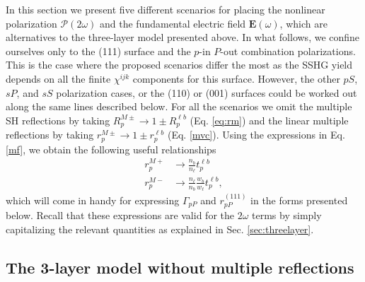 In this section we present five different scenarios for placing the nonlinear
polarization $\boldsymbol{\mathcal{P}}(2\omega)$ and the fundamental electric
field $\mathbf{E}(\omega)$, which are alternatives to the three-layer model
presented above. In what follows, we confine ourselves only to the (111) surface
and the $p$-in $P$-out combination polarizations. This is the case where the
proposed scenarios differ the most as the SSHG yield depends on all the finite
$\chi^{ijk}$ components for this surface. However, the other $pS$, $sP$, and
$sS$ polarization cases, or the (110) or (001) surfaces could be worked out
along the same lines described below. For all the scenarios we omit the multiple
SH reflections by taking $R^{M\pm}_{p}\to 1\pm R^{\ell b}_{p}$ (Eq.
\eqref{eq:rm}) and the linear multiple reflections by taking $r^{M\pm}_{p}\to
1\pm r^{\ell b}_{p}$ (Eq. \eqref{mvc}). Using the expressions in Eq. \eqref{mf},
we obtain the following useful relationships
\begin{equation}\label{mvc89}
\begin{split}
r^{M+}_{p}&\to\frac{n_{b}}{n_{\ell}}t^{\ell b}_{p}\\
r^{M-}_{p}&\to\frac{n_{\ell}}{n_{b}}\frac{w_{b}}{w_{\ell}}t^{\ell b}_{p},
\end{split}
\end{equation}
which will come in handy for expressing $\Gamma_{pP}$ and $r^{(111)}_{pP}$ in
the forms presented below. Recall that these expressions are valid for the
$2\omega$ terms by simply capitalizing the relevant quantities as explained in
Sec. \ref{sec:threelayer}.



\subsection{The 3-layer model without multiple reflections}\label{sec:nomr}

